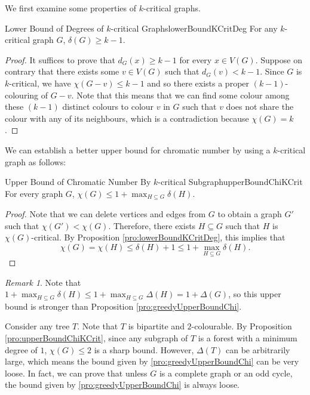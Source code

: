 \documentclass[math]{amznotes}
\theoremstyle{remark}
\newtheorem*{remark}{Remark}
\begin{document}
We first examine some properties of $k$-critical graphs.
\begin{probox}{Lower Bound of Degrees of $k$-critical Graphs}{lowerBoundKCritDeg}
    For any $k$-critical graph $G$, $\delta(G) \geq k - 1$.
    \tcblower
    \begin{proof}
        It suffices to prove that $d_G(x) \geq k - 1$ for every $x \in V(G)$. Suppose on contrary that there exists some $v \in V(G)$ such that $d_G(v) < k - 1$. Since $G$ is $k$-critical, we have $\chi(G - v) \leq k - 1$ and so there exists a proper $(k - 1)$-colouring of $G - v$. Note that this means that we can find some colour among these $(k - 1)$ distinct colours to colour $v$ in $G$ such that $v$ does not share the colour with any of its neighbours, which is a contradiction because $\chi(G) = k$.
    \end{proof}
\end{probox}
We can establish a better upper bound for chromatic number by using a $k$-critical graph as follows:
\begin{probox}{Upper Bound of Chromatic Number By $k$-critical Subgraph}{upperBoundChiKCrit}
    For every graph $G$, $\chi(G) \leq 1 + \max_{H \subseteq G}\delta(H)$.
    \tcblower
    \begin{proof}
        Note that we can delete vertices and edges from $G$ to obtain a graph $G'$ such that $\chi(G') < \chi(G)$. Therefore, there exists $H \subseteq G$ such that $H$ is $\chi(G)$-critical. By Proposition \ref{pro:lowerBoundKCritDeg}, this implies that
        \begin{equation*}
            \chi(G) = \chi(H) \leq \delta(H) + 1 \leq 1 + \max_{H \subseteq G}\delta(H).
        \end{equation*}
    \end{proof}
\end{probox}
\begin{notebox}
    \begin{remark}
        Note that $1 + \max_{H \subseteq G}\delta(H) \leq 1 + \max_{H \subseteq G}\Delta(H) = 1 + \Delta(G)$, so this upper bound is stronger than Proposition \ref{pro:greedyUpperBoundChi}.
    \end{remark}
\end{notebox}
Consider any tree $T$. Note that $T$ is bipartite and $2$-colourable. By Proposition \ref{pro:upperBoundChiKCrit}, since any subgraph of $T$ is a forest with a minimum degree of $1$, $\chi(G) \leq 2$ is a sharp bound. However, $\Delta(T)$ can be arbitrarily large, which means the bound given by \ref{pro:greedyUpperBoundChi} can be very loose. In fact, we can prove that unless $G$ is a complete graph or an odd cycle, the bound given by \ref{pro:greedyUpperBoundChi} is always loose.
\end{document}
